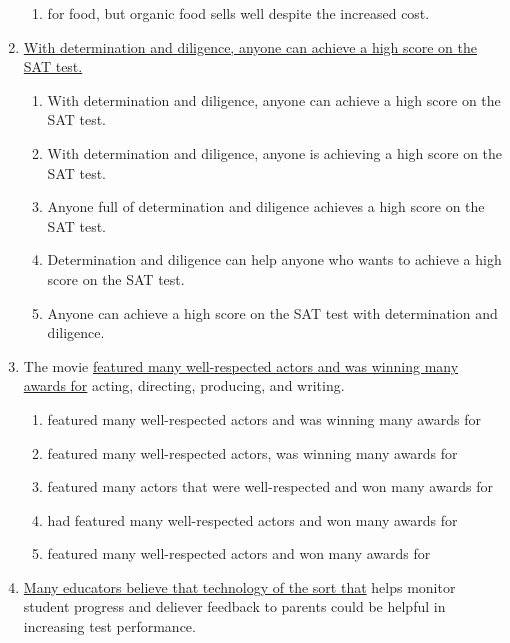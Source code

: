 \begin{enumerate}
\begin{enumerate}[label=(\Alph*)]
\item for food, but organic food sells well despite the increased cost. \hrulefill

\end{enumerate}

\bigskip
\item \ul{With determination and diligence, anyone can achieve a high score on the SAT test.}

\bigskip
\begin{enumerate}[label=(\Alph*)]

\item With determination and diligence, anyone can achieve a high score on the SAT test. \hrulefill
\item With determination and diligence, anyone is achieving a high score on the SAT test.\hrulefill
\item Anyone full of determination and diligence achieves a high score on the SAT test.\hrulefill
\item Determination and diligence can help anyone who wants to achieve a high score on the SAT test. \hrulefill
\item Anyone can achieve a high score on the SAT test with determination and diligence.\hrulefill
\end{enumerate}

\bigskip
\item The movie \ul{featured many well-respected actors and was winning many awards for} acting, directing, producing, and writing. 

\bigskip
\begin{enumerate}[label=(\Alph*)]
\item featured many well-respected actors and was winning many awards for \hrulefill
\item featured many well-respected actors, was winning many awards for\hrulefill
\item featured many actors that were well-respected and won many awards for \hrulefill
\item had featured many well-respected actors and won many awards for\hrulefill
\item featured many well-respected actors and won many awards for \hrulefill
\end{enumerate}

\bigskip
\item \ul{Many educators believe that technology of the sort that} helps monitor student progress and deliever feedback to parents could be helpful in increasing test performance. 


\end{enumerate}
